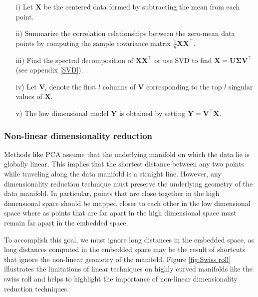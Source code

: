 \begin{itemize}
\item[i)] Let $\textbf{X}$ be the centered data formed by subtracting the mean from each point.
\item[ii)] Summarize the correlation relationships between the zero-mean data points by computing the sample covariance matrix $\frac{1}{n}\textbf{XX}^{\top}.$
\item[iii)] Find the spectral decomposition of $\textbf{XX}^{\top}$ or 
use SVD to find $\textbf{X} = \bm{U\Sigma V^{\top}}$  (see appendix \ref{SVD}).
\item[iv)] Let $\bm{V}_{l}$ denote the first $l$ columns of $\textbf{V}$ corresponding to the  top $l$ singular values of $\textbf{X}$.
\item[v)] The low dimensional model $\textbf{Y}$ is obtained by setting 
$\textbf{Y} = \textbf{V}^{\top}\textbf{X}$.
\end{itemize}

\subsubsection{Non-linear dimensionality reduction} 
Methods like PCA assume that the underlying manifold on which the data lie is globally linear. This implies that the shortest distance between any two points while traveling along the data manifold is a straight line.
However, any dimensionality reduction technique must preserve the underlying geometry of the data manifold. In particular, points that are close together in the high dimensional space should be mapped closer to each other in the low dimensional space where as points that are far apart in the high dimensional space must remain far apart in the embedded space.


To accomplish this goal, we must ignore long distances in the embedded space, as long distances computed in the embedded space may be the result of shortcuts that ignore the non-linear geometry of the manifold.
Figure \ref{fig:Swiss roll} illustrates the limitations of linear techniques on highly curved manifolds like the swiss roll and helps to highlight the importance of non-linear dimensionality reduction techniques.


